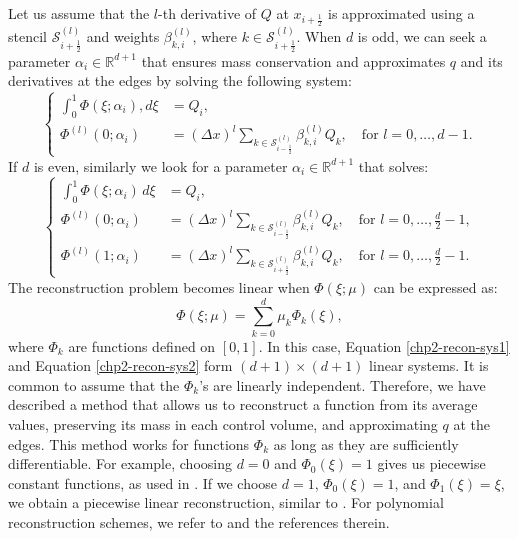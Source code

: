 Let us assume that the $l$-th derivative of $Q$ at $x_{i+\frac{1}{2}}$ is approximated using a
stencil $\mathcal{S}^{(l)}_{i+\frac{1}{2}}$ and weights $\beta^{(l)}_{k,i}$, where 
$k \in \mathcal{S}^{(l)}_{i+\frac{1}{2}}$. When $d$ is odd, we can seek a parameter
$\alpha_i \in \mathbb{R}^{d+1}$ that ensures mass conservation and approximates
$q$ and its derivatives at the edges by solving the following system:
\begin{equation}
	\label{chp2-recon-sys1}
	\begin{cases}
		\int_{0}^{1} \Phi(\xi;\alpha_i) ,d\xi &= {Q}_i,\\
		\Phi^{(l)}(0;\alpha_i) &= (\Delta x)^l \sum_{k \in 
		\mathcal{S}^{(l)}_{i-\frac{1}{2}}} \beta_{k,i}^{(l)} {Q}_k, \quad \text{for } l = 0, \ldots, d-1.
	\end{cases}
\end{equation}
If $d$ is even, similarly we look for a parameter $\alpha_i \in \mathbb{R}^{d+1}$ that solves:
\begin{equation}
	\begin{cases}
		\label{chp2-recon-sys2}
		\int_{0}^{1} \Phi(\xi;\alpha_i) \,d\xi &= {Q}_i,\\
		\Phi^{(l)}(0;\alpha_i) &= (\Delta x)^l \sum_{k \in \mathcal{S}^{(l)}_{i-\frac{1}{2}}} \beta_{k,i}^{(l)} {Q}_k, \quad \text{for } l = 0, \ldots, \frac{d}{2}-1,\\
		\Phi^{(l)}(1;\alpha_i) &= (\Delta x)^l \sum_{k \in \mathcal{S}^{(l)}_{i+\frac{1}{2}}} \beta_{k,i}^{(l)} {Q}_k, \quad \text{for } l = 0, \ldots, \frac{d}{2}-1.
	\end{cases}
\end{equation}
The reconstruction problem becomes linear when $\Phi(\xi;\mu)$ can be expressed as:
\begin{equation*}
	\Phi(\xi;\mu) = \sum_{k=0}^d \mu_k \Phi_k(\xi),
\end{equation*}
where $\Phi_k$ are functions defined on $[0,1]$. In this case, Equation 
\eqref{chp2-recon-sys1} and Equation \eqref{chp2-recon-sys2} form $(d+1)\times (d+1)$ linear systems.
It is common to assume that the $\Phi_k$'s are linearly independent.
Therefore, we have described a method that allows us to reconstruct a 
function from its average values, preserving its mass in each control volume, 
and approximating $q$ at the edges. This method works for functions $\Phi_k$
as long as they are sufficiently differentiable.
For example, choosing $d=0$ and $\Phi_0(\xi)=1$ gives us piecewise constant
functions, as used in \citet{godunov:1959}.
If we choose $d=1$, $\Phi_0(\xi)=1$, and $\Phi_1(\xi)=\xi$, we 
obtain a piecewise linear reconstruction, similar to \citet{vanleer:1977}.
For polynomial reconstruction schemes, we refer to \citet{engwirda:2016} and the references therein.
